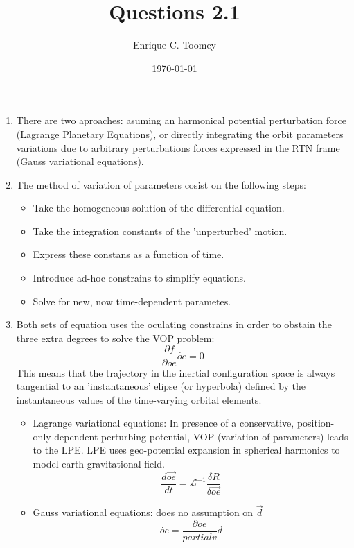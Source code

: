 \documentclass[a4paper]{article}
\begin{document}
\title{Questions 2.1}
\author{Enrique C. Toomey}
\date{\today}
\maketitle
\begin{enumerate}[label=\emph{\alph*)}]
  \item %
    There are two aproaches: asuming an harmonical potential perturbation force (Lagrange Planetary Equations), or directly integrating the orbit parameters variations due to arbitrary perturbations forces expressed in the RTN frame (Gauss variational equations).
  \item %
    The method of variation of parameters cosist on the following steps:
    \begin{itemize}
      \item Take the homogeneous solution of the differential equation.
      \item Take the integration constants of the 'unperturbed' motion.
      \item Express these constans as a function of time.
      \item Introduce ad-hoc constrains to simplify equations.
      \item Solve for new, now time-dependent parametes.
    \end{itemize}
  \item %
    Both sets of equation uses the oculating constrains in order to obstain the three extra degrees to solve the VOP problem:
    \[\frac{\partial f}{\partial oe} \dot{oe} = 0\]
    This means that the trajectory in the inertial configuration space is always tangential to an 'instantaneous' elipse (or hyperbola) defined by the instantaneous values of the time-varying orbital elements.
    \begin{itemize}
      \item Lagrange variational equations: In presence of a conservative, position-only dependent perturbing potential, VOP (variation-of-parameters) leads to the LPE. LPE uses geo-potential expansion in spherical harmonics to model earth gravitational field.
	\[\frac{d\vec{oe}}{dt} = \mathscr{L}^{-1}\frac{\delta R}{\delta \vec{oe}} \]
      \item Gauss variational equations: does no assumption on $\vec{d}$
	\[\dot{oe}=\frac{\partial oe}{partial v} d\]
    \end{itemize}
  

\end{enumerate}
\end{document}

